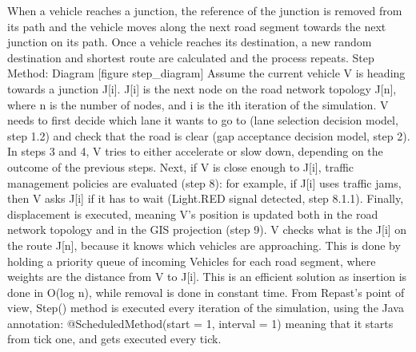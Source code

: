 \documentclass[11pt]{article}
\begin{document}
When a vehicle reaches a junction, the reference of the junction is removed from its path and the vehicle moves along the next road segment towards the next junction on its path. Once a vehicle reaches its destination, a new random destination and shortest route are calculated and the process repeats.
Step Method: Diagram
[figure step_diagram]
Assume the current vehicle V is heading towards a junction J[i]. J[i] is the next node on the road network topology J[n], where n is the number of nodes, and i is the ith iteration of the simulation. 
V needs to first decide which lane it wants to go to (lane selection decision model, step 1.2) and check that the road is clear (gap acceptance decision model, step 2). 
In steps 3 and 4, V tries to either accelerate or slow down, depending on the outcome of the previous steps. 
Next, if V is close enough to J[i], traffic management policies are evaluated (step 8): for example, if J[i] uses traffic jams, then V asks J[i] if it has to wait (Light.RED signal detected, step 8.1.1). Finally, displacement is executed, meaning V’s position is updated both in the road network topology and in the GIS projection (step 9).
V checks what is the J[i] on the route J[n], because it knows which vehicles are approaching. This is done by holding a priority queue of incoming Vehicles for each road segment, where weights are the distance from V to J[i]. This is an efficient solution as insertion is done in O(log n), while removal is done in constant time.
From Repast’s point of view, Step() method is executed every iteration of the simulation, using the Java annotation: @ScheduledMethod(start = 1, interval = 1) meaning that it starts from tick one, and gets executed every tick.
\end{document}
